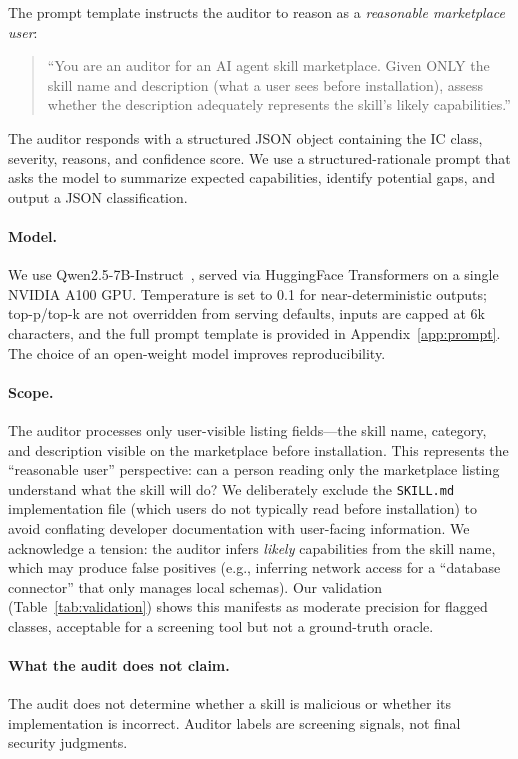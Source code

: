 \documentclass[11pt]{article}
\begin{document}
The prompt template instructs the auditor to reason as a
\emph{reasonable marketplace user}:
\begin{quote}\small
``You are an auditor for an AI agent skill marketplace.
Given ONLY the skill name and description (what a user sees
before installation), assess whether the description
adequately represents the skill's likely capabilities.''
\end{quote}
The auditor responds with a structured JSON object containing
the IC class, severity, reasons, and confidence score.
We use a structured-rationale prompt that asks the
model to summarize expected capabilities, identify
potential gaps, and output a JSON classification.

\paragraph{Model.}
We use Qwen2.5-7B-Instruct~\cite{qwen2025}, served via
HuggingFace Transformers on a single NVIDIA A100 GPU.
Temperature is set to 0.1 for near-deterministic outputs;
top-p/top-k are not overridden from serving defaults,
inputs are capped at 6k characters, and the full prompt
template is provided in Appendix~\ref{app:prompt}.
The choice of an open-weight model improves reproducibility.

\paragraph{Scope.}
The auditor processes only user-visible listing fields---the
skill name, category, and description visible on the
marketplace before installation.
This represents the ``reasonable user'' perspective:
can a person reading only the marketplace listing understand
what the skill will do?
We deliberately exclude the \texttt{SKILL.md} implementation
file (which users do not typically read before installation)
to avoid conflating developer documentation with
user-facing information.
We acknowledge a tension: the auditor infers \emph{likely}
capabilities from the skill name, which may produce false positives
(e.g., inferring network access for a ``database connector''
that only manages local schemas).
Our validation (Table~\ref{tab:validation}) shows this
manifests as moderate precision for flagged classes,
acceptable for a screening tool but not a ground-truth oracle.

\paragraph{What the audit does not claim.}
The audit does not determine whether a skill is
malicious or whether its implementation is incorrect.
Auditor labels are screening signals, not final
security judgments.
\end{document}
